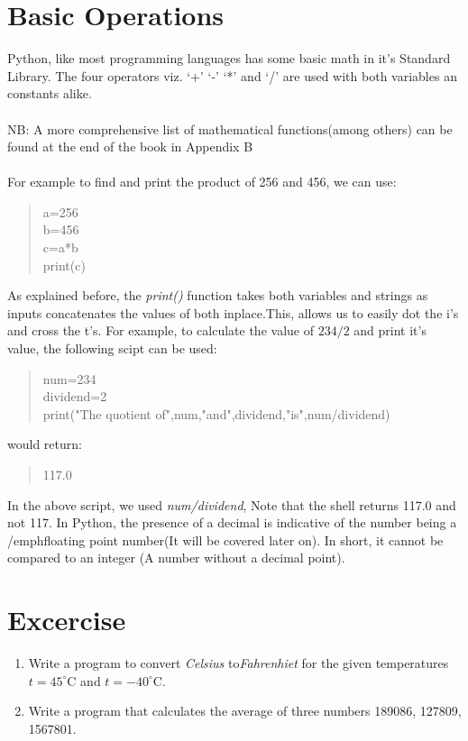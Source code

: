 \section{Basic Operations}
Python, like most programming languages has some basic math in it's Standard Library. The four operators viz. `+' `-' `*' and `/' are used with both variables an constants alike.
\\ \\ NB: A more comprehensive list of mathematical functions(among others) can be found at the end of the book in Appendix B\\ \\
 For example to find and print the product of 256 and 456, we can use:
\begin{quote}
a=256\\b=456\\c=a*b\\print(c)
\end{quote}
As explained before, the  \emph{print()} function takes both variables and strings as inputs concatenates the values of both inplace.This, allows us to easily dot the i's and cross the t's. For example, to calculate the value of $234/2$ and print it's value, the following scipt can be used:

\begin{quote}
num=234\\
dividend=2\\
print("The quotient of",num,"and",dividend,"is",num/dividend)
\end{quote}
would return:
\begin{quote}
117.0
\end{quote}

In the above script, we used \emph{num/dividend}, 
Note that the shell returns 117.0 and not 117. In Python, the presence of a decimal is indicative of the number being a /emph{floating point} number(It will be covered later on). In short, it cannot be compared to an integer (A number without a decimal point).

\newpage	
\section{Excercise}
\begin{enumerate}
\item Write a program to convert \emph{Celsius} to\emph{Fahrenhiet} for the given temperatures $t=45^{\circ}$C and $t=-40^{\circ}$C.
\item Write a program that calculates the average of three numbers 189086, 127809, 1567801.
\end{enumerate}



